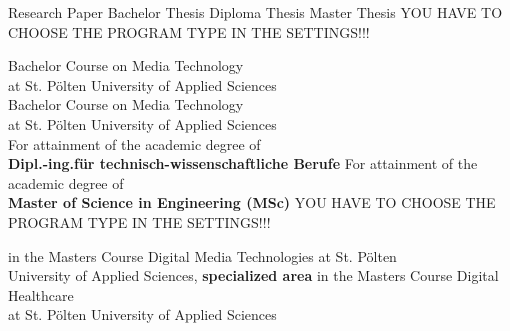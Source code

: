 \begin{center}

\vspace{1cm}

\begin{minipage}[t][5cm][s]{\textwidth}%
\centering
\Huge{{\color{FH2}{\fontsize{24}{30} \selectfont \workTitle\\}}}
\vspace{0.5cm}
\LARGE{{\color{FH2}{\fontsize{16}{24} \selectfont \subTitle\\}}}
\end{minipage}

\vspace{1cm}

\ifuseBachelorMediaTechnologiesOne
	\LARGE{Research Paper}
\else
	\ifuseBachelorMediaTechnologiesTwo
		\LARGE{Bachelor Thesis}
\else
	\ifuseMasterDigitalMediaTechnologies
		\LARGE{Diploma Thesis}
\else
	\ifuseMasterDigitalHealthCare
		\LARGE{Master Thesis}
    \else
        \LARGE{YOU HAVE TO CHOOSE THE PROGRAM TYPE IN THE SETTINGS!!!}
  	\fi
\fi
\fi
\fi
  
\vspace{1.3cm}
\ifuseBachelorMediaTechnologiesOne
	\fontsize{11pt}{15pt}\selectfont Bachelor Course on Media Technology\\
at St. Pölten University of Applied Sciences\\  
\else
	\ifuseBachelorMediaTechnologiesTwo
		\fontsize{11pt}{15pt}\selectfont Bachelor Course on Media Technology\\
at St. Pölten University of Applied Sciences\\  
\else
	\ifuseMasterDigitalMediaTechnologies
		\fontsize{11pt}{15pt}\selectfont For attainment of the academic degree of\\
		\textbf{Dipl.-ing.für technisch-wissenschaftliche Berufe}
\else
	\ifuseMasterDigitalHealthCare
    	\fontsize{11pt}{15pt}\selectfont For attainment of the academic degree of\\
		\textbf{Master of Science in Engineering (MSc)}
    \else
        \LARGE{YOU HAVE TO CHOOSE THE PROGRAM TYPE IN THE SETTINGS!!!}
  	\fi
\fi
\fi
\fi

\vspace{4mm}
 
\ifuseMasterDigitalMediaTechnologies
	in the Masters Course Digital Media Technologies at St. Pölten\\ 
University of Applied Sciences, \textbf{specialized area \specialization}
\else
	\ifuseMasterDigitalHealthCare
		in the Masters Course Digital Healthcare\\ 
at St. Pölten University of Applied Sciences
    \else
  	\fi
\fi






\end{center}
